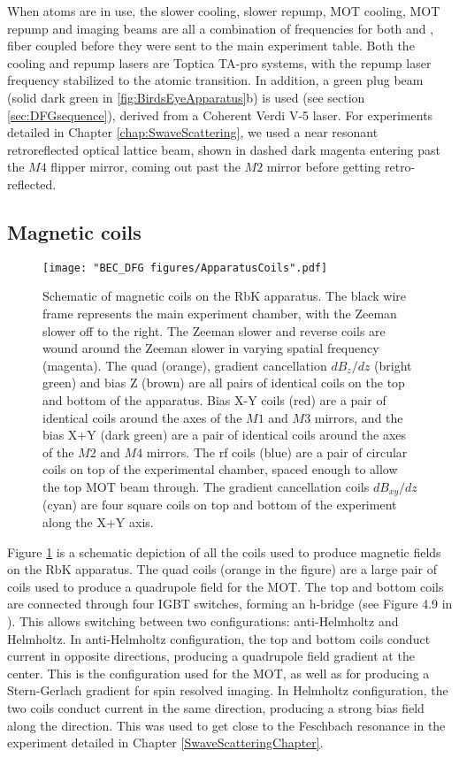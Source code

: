 When \K{} atoms are in use, the slower cooling, slower repump, MOT cooling, MOT repump and imaging beams are all a combination of frequencies for both \Rb{} and \K{}, fiber coupled before they were sent to the main experiment table. Both the \K{} cooling and repump lasers are Toptica TA-pro systems, with the repump laser frequency stabilized to the \K{} atomic transition. In addition, a green plug beam (solid dark green in \ref{fig:BirdsEyeApparatus}b) is used (see section \ref{sec:DFGsequence}), derived from a Coherent Verdi V-5 laser. For \K{} experiments detailed in Chapter \ref{chap:SwaveScattering}, we used a near resonant retroreflected optical lattice beam, shown in dashed dark magenta entering past the $M4$ flipper mirror, coming out past the $M2$ mirror before getting retro-reflected.

\subsection{Magnetic coils}\label{sec:magneticCoils}
\begin{figure}
	\texttt{[image: "BEC\_DFG figures/ApparatusCoils".pdf]}
\caption[Schematic of magnetic coils on the RbK apparatus]{Schematic of magnetic coils on the RbK apparatus. The black wire frame represents the main experiment chamber, with the Zeeman slower off to the right. The Zeeman slower and reverse coils are wound around the Zeeman slower in varying spatial frequency (magenta). The quad (orange), gradient cancellation $dB_z/dz$ (bright green) and bias Z (brown) are all pairs of identical coils on the top and bottom of the apparatus. Bias X-Y coils (red) are a pair of identical coils around the axes of the $M1$ and $M3$ mirrors, and the bias X+Y (dark green) are a pair of identical coils around the axes of the $M2$ and $M4$ mirrors. The rf coils (blue) are a pair of circular coils on top of the experimental chamber, spaced enough to allow the top MOT beam through. The gradient cancellation coils $dB_{xy}/dz$ (cyan) are four square coils on top and bottom of the experiment along the X+Y axis. }
\label{fig:ApparatusCoils}
\end{figure}

Figure \ref{fig:ApparatusCoils} is a schematic depiction of all the coils used to produce magnetic fields on the RbK apparatus. The quad coils (orange in the figure) are a large pair of coils used to produce a quadrupole field for the MOT. The top and bottom coils are connected through four IGBT switches, forming an h-bridge (see Figure 4.9 in \cite{AycockThesis}). This allows switching between two configurations: anti-Helmholtz and Helmholtz. In anti-Helmholtz configuration, the top and bottom coils conduct current in opposite directions, producing a quadrupole field gradient at the center. This is the configuration used for the MOT, as well as for producing a Stern-Gerlach gradient for spin resolved imaging. In Helmholtz configuration, the two coils conduct current in the same direction, producing a strong bias field along the \ez{} direction. This was used to get close to the Feschbach resonance in the experiment detailed in Chapter \ref{SwaveScatteringChapter}. 

